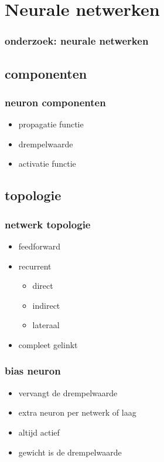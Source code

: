 \documentclass{beamer}
\begin{document}
\section{Neurale netwerken}
\begin{frame}
  \frametitle{onderzoek: neurale netwerken}
  \transfade
\end{frame}
\subsection{componenten}
\begin{frame}
  \frametitle{neuron componenten}
  \transfade
  \begin{itemize}
    \item<+-> propagatie functie
    \item<+-> drempelwaarde
    \item<+-> activatie functie
  \end{itemize}
\end{frame}
\subsection{topologie}
\begin{frame}
  \frametitle{netwerk topologie}
  \transfade
  \begin{itemize}
    \item<+-> feedforward
    \item<+-> recurrent
      \begin{itemize}
        \item direct
        \item indirect
        \item lateraal
      \end{itemize}
    \item<+-> compleet gelinkt
  \end{itemize}
\end{frame}
\begin{frame}
  \frametitle{bias neuron}
  \transfade
  \begin{itemize}
    \item<+-> vervangt de drempelwaarde
    \item<+-> extra neuron per netwerk of laag
    \item<+-> altijd actief
    \item<+-> gewicht is de drempelwaarde
  \end{itemize}
\end{frame}
\end{document}

